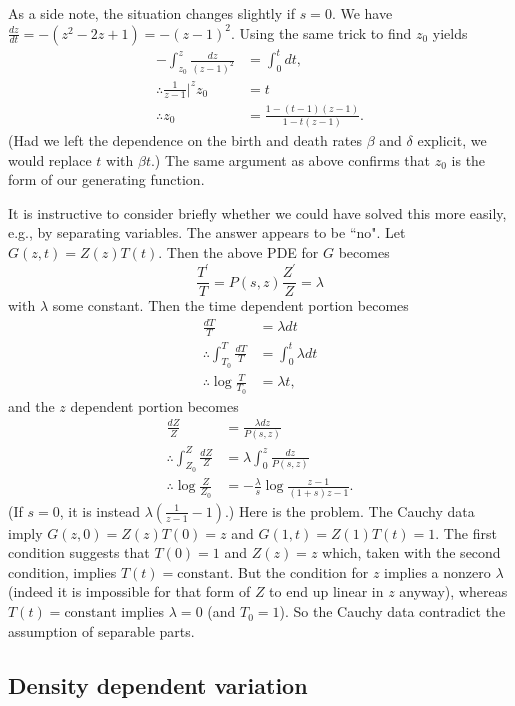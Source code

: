 \documentclass[10pt]{revtex4}
\begin{document}
As a side note, the situation changes slightly if $s = 0$.
We have $\frac{dz}{dt} = -(z^2-2z+1) = -(z-1)^2$.
Using the same trick to find $z_0$ yields
\begin{align}
-\int_{z_0}^z \frac{dz}{(z-1)^2} &= \int_0^t dt, \nonumber \\
\therefore \frac{1}{z-1} |^{z}{z_0} &= t \nonumber \\
\therefore z_0 &= \frac{1-(t-1)(z-1)}{1-t(z-1)}.
\end{align}
(Had we left the dependence on the birth and death rates $\beta$ and $\delta$ explicit, we would replace $t$ with $\beta t$.)
The same argument as above confirms that $z_0$ is the form of our generating function.

It is instructive to consider briefly whether we could have solved this more easily, e.g., by separating variables.
The answer appears to be ``no".
Let $G(z,t) = Z(z)T(t)$.
Then the above PDE for $G$ becomes
\begin{equation}
\frac{T^\prime}{T} = P(s,z)\frac{Z^\prime}{Z} = \lambda
\end{equation}
with $\lambda$ some constant.
Then the time dependent portion becomes
\begin{align}
\frac{dT}{T} &= \lambda dt \nonumber \\
\therefore \int^T_{T_0} \frac{dT}{T} &= \int^t_0 \lambda dt \nonumber \\
\therefore \log \frac{T}{T_0} &= \lambda t,
\end{align}
and the $z$ dependent portion becomes
\begin{align}
\frac{dZ}{Z} &= \frac{\lambda dz}{P(s,z)} \nonumber \\
\therefore \int^Z_{Z_0} \frac{dZ}{Z} &= \lambda \int_0^z \frac{dz}{P(s,z)} \nonumber \\
\therefore \log \frac{Z}{Z_0} &= -\frac{\lambda}{s} \log \frac{z-1}{(1+s)z-1}.
\end{align}
(If $s = 0$, it is instead $\lambda(\frac{1}{z-1} - 1)$.)
Here is the problem.
The Cauchy data imply $G(z,0) = Z(z)T(0) = z$ and $G(1,t) = Z(1)T(t) = 1$.
The first condition suggests that $T(0) = 1$ and $Z(z) = z$ which, taken with the second condition, implies $T(t) = \mathrm{constant}$.
But the condition for $z$ implies a nonzero $\lambda$ (indeed it is impossible for that form of $Z$ to end up linear in $z$ anyway), whereas $T(t) = \mathrm{constant}$ implies $\lambda = 0$ (and $T_0 = 1$).
So the Cauchy data contradict the assumption of separable parts.

\subsection{Density dependent variation}
\end{document}
